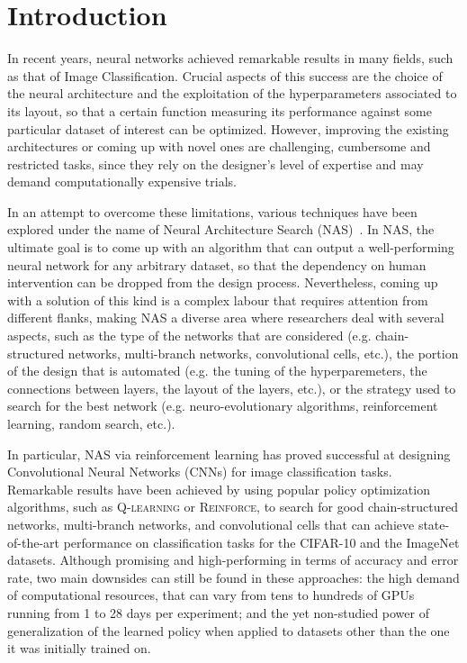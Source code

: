 \section{Introduction}

In recent years, neural networks achieved remarkable results in many fields, such as that of Image Classification. Crucial aspects of this success are the choice of the neural architecture and the exploitation of the hyperparameters associated to its layout, so that a certain function measuring its performance against some particular dataset of interest can be optimized. However, improving the existing architectures or coming up with novel ones are challenging, cumbersome and restricted tasks, since they rely on the designer's level of expertise and may demand computationally expensive trials. %

In an attempt to overcome these limitations, various techniques have been explored under the name of Neural Architecture Search (NAS)~\citep{NASsurvey}. In NAS, the ultimate goal is to come up with an algorithm that can output a well-performing neural network for any arbitrary dataset, so that the dependency on human intervention can be dropped from the design process. Nevertheless, coming up with a solution of this kind is a complex labour that requires attention from different flanks, making NAS a diverse area where researchers deal with several aspects, such as the type of the networks that are considered (e.g. chain-structured networks, multi-branch networks, convolutional cells, etc.), the portion of the design that is automated (e.g. the tuning of the hyperparemeters, the connections between layers, the layout of the layers, etc.), or the strategy used to search for the best network (e.g. neuro-evolutionary algorithms, reinforcement learning, random search, etc.).

In particular, NAS via reinforcement learning has proved successful at designing Convolutional Neural Networks (CNNs) for image classification tasks. Remarkable results have been achieved by using popular policy optimization algorithms, such as \textsc{Q-learning} or \textsc{Reinforce}, to search for good chain-structured networks, multi-branch networks, and convolutional cells that can achieve state-of-the-art performance on classification tasks for the CIFAR-10 and the ImageNet datasets. Although promising and high-performing in terms of accuracy and error rate, two main downsides can still be found in these approaches: the high demand of computational resources, that can vary from tens to hundreds of GPUs running from 1 to 28 days per experiment; and the yet non-studied power of generalization of the learned policy when applied to datasets other than the one it was initially trained on.

